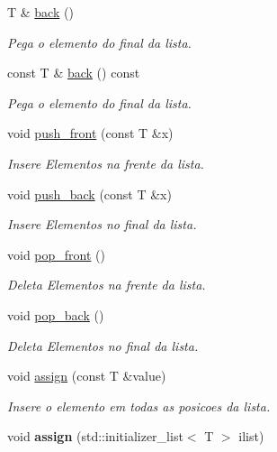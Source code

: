 \begin{DoxyCompactItemize}
T \& \hyperlink{class_list_adcf79239b840f8600ea74e526120e69b}{back} ()
\begin{DoxyCompactList}\small\item\em Pega o elemento do final da lista. \end{DoxyCompactList}\item 
const T \& \hyperlink{class_list_a20e620772670fea9011193aa6e9caea5}{back} () const 
\begin{DoxyCompactList}\small\item\em Pega o elemento do final da lista. \end{DoxyCompactList}\item 
void \hyperlink{class_list_a2919a4bfce2d3ef66d13f64d5f722f4f}{push\+\_\+front} (const T \&x)
\begin{DoxyCompactList}\small\item\em Insere Elementos na frente da lista. \end{DoxyCompactList}\item 
void \hyperlink{class_list_ada56bf4c89094e9bbda854fc88cbacea}{push\+\_\+back} (const T \&x)
\begin{DoxyCompactList}\small\item\em Insere Elementos no final da lista. \end{DoxyCompactList}\item 
void \hyperlink{class_list_a024af4543f71544345351a45850c42d8}{pop\+\_\+front} ()
\begin{DoxyCompactList}\small\item\em Deleta Elementos na frente da lista. \end{DoxyCompactList}\item 
void \hyperlink{class_list_a42e1aee3e26b76b3f4d9386efa7fe8b7}{pop\+\_\+back} ()
\begin{DoxyCompactList}\small\item\em Deleta Elementos no final da lista. \end{DoxyCompactList}\item 
void \hyperlink{class_list_ab916628c8dd07761839b565ac533c6c7}{assign} (const T \&value)
\begin{DoxyCompactList}\small\item\em Insere o elemento em todas as posicoes da lista. \end{DoxyCompactList}\item 
void {\bfseries assign} (std\+::initializer\+\_\+list$<$ T $>$ ilist)\hypertarget{class_list_aa402aceaa13297356e19b1040f7852de}{}\label{class_list_aa402aceaa13297356e19b1040f7852de}


\end{DoxyCompactItemize}
